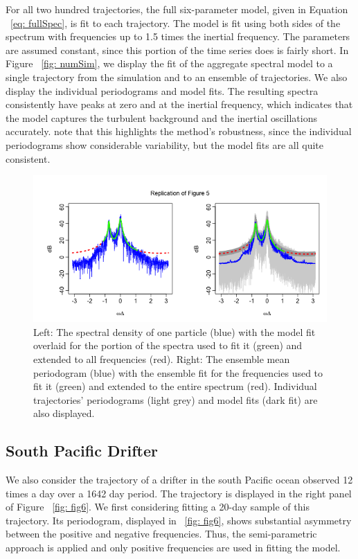 \documentclass{stat572Style}
\begin{document}
\par For all two hundred trajectories, the full six-parameter model, given in Equation ~\ref{eq: fullSpec}, is fit to each trajectory. 
The model is fit using both sides of the spectrum with frequencies up to 1.5 times the inertial frequency. 
The parameters are assumed constant, since this portion of the time series does is fairly short. 
In Figure ~\ref{fig: numSim}, we display the fit of the aggregate spectral model to a single trajectory from the simulation and to an ensemble of trajectories. 
We also display the individual periodograms and model fits. 
The resulting spectra consistently have peaks at zero and at the inertial frequency, which indicates that the model captures the turbulent background and the inertial oscillations accurately. 
\citet{Sykulski2016}  note that this highlights the method's robustness, since the individual periodograms show considerable variability, but the model fits are all quite consistent.

\begin{figure}[h!]
  \centering
    \includegraphics[width=\textwidth]{ReplicatedFigures/fig5.png}
        \caption{Left: The spectral density of one particle (blue) with the model fit overlaid for the portion of the spectra used to fit it (green) and extended to all frequencies (red). Right: The ensemble mean periodogram (blue) with the ensemble fit for the frequencies used to fit it (green) and extended to the entire spectrum (red). Individual trajectories' periodograms (light grey) and model fits (dark fit) are also displayed. }
        \label{fig: fig5}
\end{figure}

\subsection{South Pacific Drifter}
\label{sec: spDrift}
We also consider the trajectory of a drifter in the south Pacific ocean observed 12 times a day over a 1642 day period.  
The trajectory is displayed in the right panel of Figure ~\ref{fig: fig6}. 
We first considering fitting a 20-day sample of this trajectory. 
Its periodogram, displayed in ~\ref{fig: fig6}, shows substantial asymmetry between the positive and negative frequencies. Thus, the semi-parametric approach is applied and only positive frequencies are used in fitting the model. 
\end{document}
